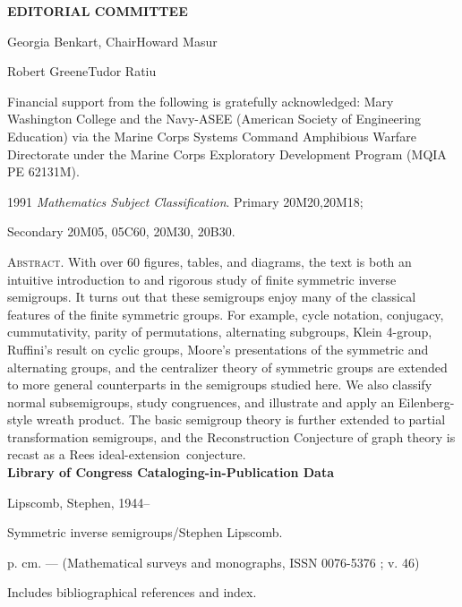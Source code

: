 \documentclass{surv-l}
\begin{document}
\begin{copyrightpage}
\begin{center}
\textbf{EDITORIAL COMMITTEE}
\end{center}

\noindent\qquad\qquad\qquad Georgia Benkart,
Chair\qquad\qquad\qquad Howard Masur

\noindent\qquad\qquad\qquad Robert
Greene\qquad\qquad\qquad\qquad\qquad Tudor Ratiu

Financial support from the following is gratefully acknowledged:
Mary Washington College and the Navy-ASEE (American Society of
Engineering Education) via the Marine Corps Systems Command
Amphibious Warfare Directorate under the Marine Corps Exploratory
Development Program (MQIA PE 62131M).

\begin{center}
1991 \emph{Mathematics Subject Classification}. Primary
20M20,20M18;

Secondary 20M05, 05C60, 20M30, 20B30.
\end{center}

\noindent \textsc{Abstract}. With over 60 figures, tables, and
diagrams, the text is both an intuitive introduction to and
rigorous study of finite symmetric inverse semigroups. It turns
out that these semigroups enjoy many of the classical features of
the finite symmetric groups. For example, cycle notation,
conjugacy, cummutativity, parity of permutations, alternating
subgroups, Klein 4-group, Ruffini's result
on cyclic groups, Moore's presentations of the symmetric and
alternating groups, and the centralizer theory of symmetric groups
are extended to more general counterparts in the semigroups
studied here. We also classify normal subsemigroups, study
congruences, and illustrate and apply an Eilenberg-style wreath
product. The basic semigroup theory is further extended to partial
transformation semigroups, and the Reconstruction
Conjecture of graph theory is
recast as a Rees ideal-extension~conjecture.\\

\textbf{Library of Congress Cataloging-in-Publication Data}

Lipscomb, Stephen, 1944--

\quad Symmetric inverse semigroups/Stephen Lipscomb.

\qquad p. cm. --- (Mathematical surveys and monographs, ISSN
0076-5376 ; v. 46)

\quad Includes bibliographical references and index.


\end{copyrightpage}
\end{document}
